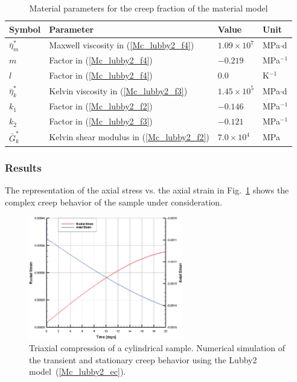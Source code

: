 \begin{table}[!htb]
\centering
\caption{Material parameters for the creep fraction of the material model}
\label{Mc_matpar_lubby2_2}
\begin{tabular}{llll}
\toprule
Symbol & Parameter & Value & Unit \\
\midrule
${\bar\eta}^{\ast}_m$ & Maxwell viscosity in (\ref{Mc_lubby2_f4})    & $1.09\times 10^7$ & MPa$\cdot$d \\
$m$                   & Factor in (\ref{Mc_lubby2_f4})               & $-0.219$          & MPa$^{-1}$  \\
$l$                   & Factor in (\ref{Mc_lubby2_f4})               & $0.0$             & K$^{-1}$    \\
${\bar\eta}^{\ast}_k$ & Kelvin viscosity in (\ref{Mc_lubby2_f3})     & $1.45\times 10^5$ & MPa$\cdot$d \\
$k_1$                 & Factor in (\ref{Mc_lubby2_f2})               & $-0.146$          & MPa$^{-1}$  \\
$k_2$                 & Factor in (\ref{Mc_lubby2_f3})               & $-0.121$          & MPa$^{-1}$  \\
${\bar G}^{\ast}_k$   & Kelvin shear modulus in (\ref{Mc_lubby2_f2}) & $7.0\times 10^4$  & MPa         \\
\bottomrule
\end{tabular}
\end{table}

\subsubsection{Results}
\label{subsubsec:Mc4_res}

The representation of the axial stress vs. the axial strain in Fig.~\ref{Mc_triax_res_lubby2} shows the complex creep behavior of the sample under consideration.

\begin{figure}[!htb]
\begin{center}
\includegraphics[width=0.6\textwidth]{PART_II/M/svvcreep_e_HL_strain.eps}
\end{center}
\caption{Triaxial compression of a cylindrical sample. Numerical simulation of the transient and stationary creep behavior using the Lubby2 model~(\ref{Mc_lubby2_ec}).} 
\label{Mc_triax_res_lubby2}
\end{figure}
